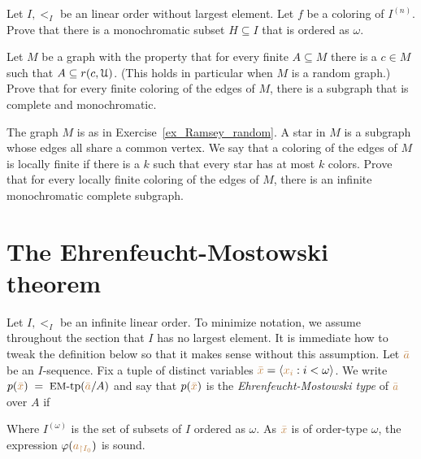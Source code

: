 \begin{exercise}\label{ex_Ramsey_order}
  Let $I,<_I$ be an linear order without largest element.
  Let $f$ be a coloring of $I^{(n)}$.
  Prove that there is a monochromatic subset $H\subseteq I$ that is ordered as $\omega$.
\end{exercise}

\begin{exercise}\label{ex_Ramsey_random}
    Let $M$ be a graph with the property that for every finite $A\subseteq M$ there is a $c\in M$ such that $A\subseteq r(c,\EuScript U)$. 
    (This holds in particular when $M$ is a random graph.)
    Prove that for every finite coloring of the edges of $M$, there is a subgraph that is complete and monochromatic.
\end{exercise}

\begin{exercise}
    The graph $M$ is as in Exercise~\ref{ex_Ramsey_random}.
    A star in $M$ is a subgraph whose edges all share a common vertex. We say that a coloring of the edges of $M$ is locally finite if there is a $k$ such that every star has at most $k$ colors.
    Prove that for every locally finite coloring of the edges of $M$, there is an infinite monochromatic complete subgraph.
\end{exercise}

\section{The Ehrenfeucht-Mostowski theorem}\label{EM}

Let $I,<_I$ be an infinite linear order.
To minimize notation, we assume throughout the section that $I$ has no largest element.
It is immediate how to tweak the definition below so that it makes sense without this assumption.
Let ${\color{brown}\bar a}$ be an $I$-sequence.
Fix a tuple of distinct variables ${\color{brown}\bar x}=\langle{\color{brown}x_i}: i<\omega\rangle$.
We write \emph{$p({\color{brown}\bar x})\;=\;\textrm{{\small EM}-tp}({\color{brown}\bar a}/A)$} and say that $p({\color{brown}\bar x})$ is the \emph{Ehren\-feucht-Mostowski type\/} of ${\color{brown}\bar a}$ over $A$ if


Where $I^{(\omega)}$ is the set of subsets of $I$ ordered as $\omega$.
As ${\color{brown}\bar x}$ is of order-type $\omega$, the expression $\varphi({\color{brown} a_{\restriction I_0}})$ is sound.

